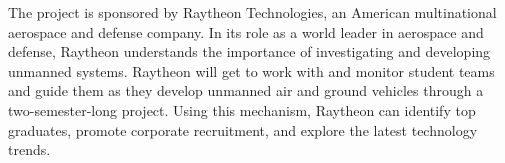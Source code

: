 
The project is sponsored by Raytheon Technologies, an American multinational aerospace and defense company.  In its role as a world leader in aerospace and defense, Raytheon understands the importance of investigating and developing unmanned systems. Raytheon will get to work with and monitor student teams and guide them as they develop unmanned air and ground vehicles through a two-semester-long project. Using this mechanism, Raytheon can identify top graduates, promote corporate recruitment, and explore the latest technology trends.
